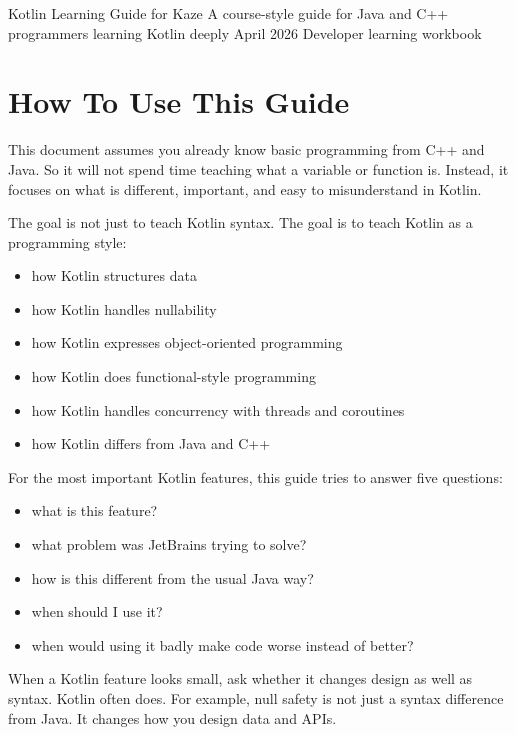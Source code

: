 \documentclass[11pt,a4paper]{article}
\begin{document}
\KazeCover
  {Kotlin Learning Guide for Kaze}
  {A course-style guide for Java and C++ programmers learning Kotlin deeply}
  {April 2026}
  {Developer learning workbook}

\KazeDocumentNotice

\section{How To Use This Guide}

This document assumes you already know basic programming from C++ and Java. So it will not spend time teaching what a variable or function is. Instead, it focuses on what is different, important, and easy to misunderstand in Kotlin.

The goal is not just to teach Kotlin syntax. The goal is to teach Kotlin as a programming style:
\begin{itemize}
    \item how Kotlin structures data
    \item how Kotlin handles nullability
    \item how Kotlin expresses object-oriented programming
    \item how Kotlin does functional-style programming
    \item how Kotlin handles concurrency with threads and coroutines
    \item how Kotlin differs from Java and C++
\end{itemize}

\begin{kazecalloutbox}
For the most important Kotlin features, this guide tries to answer five questions:
\begin{itemize}
    \item what is this feature?
    \item what problem was JetBrains trying to solve?
    \item how is this different from the usual Java way?
    \item when should I use it?
    \item when would using it badly make code worse instead of better?
\end{itemize}
\end{kazecalloutbox}

\begin{kazecalloutbox}
When a Kotlin feature looks small, ask whether it changes design as well as syntax. Kotlin often does. For example, null safety is not just a syntax difference from Java. It changes how you design data and APIs.
\end{kazecalloutbox}
\end{document}
